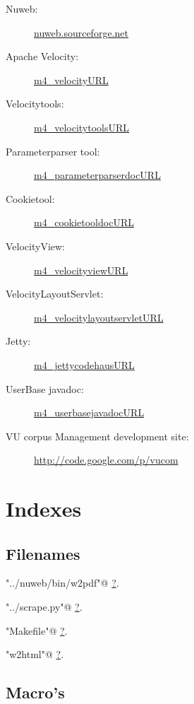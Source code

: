 \documentclass[twoside]{artikel3}
\renewcommand{\NWlink}[2]{\hyperlink{#1}{#2}}
\renewcommand{\NWlink}[2]{\hyperlink{#1}{#2}}
\begin{document}
\begin{description}
\item[Nuweb:] \url{nuweb.sourceforge.net}
\item[Apache Velocity:] \url{m4_velocityURL}
\item[Velocitytools:] \url{m4_velocitytoolsURL}
\item[Parameterparser tool:] \url{m4_parameterparserdocURL}
\item[Cookietool:] \url{m4_cookietooldocURL}
\item[VelocityView:] \url{m4_velocityviewURL}
\item[VelocityLayoutServlet:] \url{m4_velocitylayoutservletURL}
\item[Jetty:] \url{m4_jettycodehausURL}
\item[UserBase javadoc:] \url{m4_userbasejavadocURL}
\item[VU corpus Management development site:] \url{http://code.google.com/p/vucom} 
\end{description}

\section{Indexes}
\label{sec:indexes}


\subsection{Filenames}
\label{sec:filenames}


{\small\begin{list}{}{\setlength{\itemsep}{-\parsep}\setlength{\itemindent}{-\leftmargin}}
\item \verb@"../nuweb/bin/w2pdf"@ {\footnotesize {\NWtxtDefBy} \NWlink{nuweb?}{?}.}
\item \verb@"../scrape.py"@ {\footnotesize {\NWtxtDefBy} \NWlink{nuweb?}{?}.}
\item \verb@"Makefile"@ {\footnotesize {\NWtxtDefBy} \NWlink{nuweb?}{?}.}
\item \verb@"w2html"@ {\footnotesize {\NWtxtDefBy} \NWlink{nuweb?}{?}.}
\end{list}}

\subsection{Macro's}
\label{sec:macros}
\end{document}
